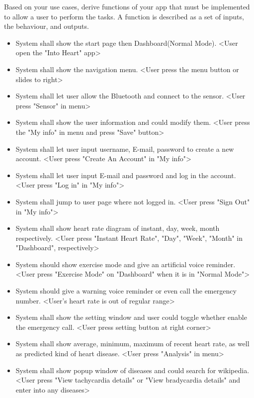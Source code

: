 Based on your use cases, derive functions of your app that must be implemented to allow a user to perform the tasks. A function is described as a set of inputs, the behaviour, and outputs. 

\begin{itemize}

\item System shall show the start page then Dashboard(Normal Mode). \textless User open the "Into Heart" app\textgreater
\item System shall show the navigation menu. \textless User press the menu button or slides to right\textgreater 
\item System shall let user allow the Bluetooth and connect to the sensor. \textless User press "Sensor" in menu\textgreater 
\item System shall show the user information and could modify them. \textless User press the "My info" in menu and press "Save" button\textgreater 
\item System shall let user input username, E-mail, password to create a new account. \textless User press "Create An Account" in "My info"\textgreater 
\item System shall let user input E-mail and password and log in the account. \textless User press "Log in" in "My info"\textgreater 
\item System shall jump to user page where not logged in. \textless User press "Sign Out" in "My info"\textgreater 
\item System shall show heart rate diagram of instant, day, week, month respectively. \textless User press "Instant Heart Rate", "Day", "Week", "Month" in "Dashboard", respectively\textgreater 
\item System should show exercise mode and give an artificial voice reminder. \textless User press "Exercise Mode" on "Dashboard" when it is in "Normal Mode"\textgreater 
\item System should give a warning voice reminder or even call the emergency number. \textless User's heart rate is out of regular range\textgreater 
\item System shall show the setting window and user could toggle whether enable the emergency call. \textless User press setting button at right corner\textgreater 
\item System shall show average, minimum, maximum of recent heart rate, as well as predicted kind of heart disease. \textless User press "Analysis" in menu\textgreater 
\item System shall show popup window of diseases and could search for wikipedia. \textless User press "View tachycardia details" or "View bradycardia details" and enter into any diseases\textgreater 

\end{itemize}
